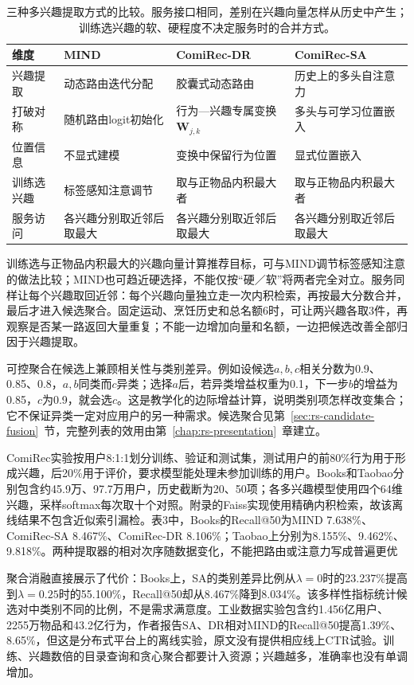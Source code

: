 \begin{table}[htbp]
 \centering\small
 \begin{tabularx}{\linewidth}{@{}lXXX@{}}
  \toprule
  维度 & MIND & ComiRec-DR & ComiRec-SA \\
  \midrule
  兴趣提取 & 动态路由迭代分配 & 胶囊式动态路由 & 历史上的多头自注意力 \\
  打破对称 & 随机路由logit初始化 & 行为—兴趣专属变换$\bm W_{j,k}$ & 多头与可学习位置嵌入 \\
  位置信息 & 不显式建模 & 变换中保留行为位置 & 显式位置嵌入 \\
  训练选兴趣 & 标签感知注意调节 & 取与正物品内积最大者 & 取与正物品内积最大者 \\
  服务访问 & 各兴趣分别取近邻后取最大 & 各兴趣分别取近邻后取最大 & 各兴趣分别取近邻后取最大 \\
  \bottomrule
 \end{tabularx}
 \caption{三种多兴趣提取方式的比较。服务接口相同，差别在兴趣向量怎样从历史中产生；训练选兴趣的软、硬程度不决定服务时的合并方式。}
 \label{tab:rs-mind-comirec}
\end{table}

训练选与正物品内积最大的兴趣向量计算推荐目标，可与MIND调节标签感知注意的做法比较；MIND也可趋近硬选择，不能仅按“硬／软”将两者完全对立。服务同样让每个兴趣取回近邻：每个兴趣向量独立走一次内积检索，再按最大分数合并，最后才进入候选聚合。固定运动、烹饪历史和总名额6时，可让两兴趣各取3件，再观察是否某一路返回大量重复；不能一边增加向量和名额，一边把候选改善全部归因于兴趣提取。

可控聚合在候选上兼顾相关性与类别差异。例如设候选$a,b,c$相关分数为0.9、0.85、0.8，$a,b$同类而$c$异类；选择$a$后，若异类增益权重为0.1，下一步$b$的增益为0.85，$c$为0.9，就会选$c$。这是教学化的边际增益计算，说明类别项怎样改变集合；它不保证异类一定对应用户的另一种需求。候选聚合见第~\ref{sec:rs-candidate-fusion}~节，完整列表的效用由第~\ref{chap:rs-presentation}~章建立。

ComiRec实验按用户8:1:1划分训练、验证和测试集，测试用户的前80\%行为用于形成兴趣，后20\%用于评价，要求模型能处理未参加训练的用户。Books和Taobao分别包含约45.9万、97.7万用户，历史截断为20、50项；各多兴趣模型使用四个64维兴趣，采样softmax每次取十个对照。附录的Faiss实现使用精确内积检索，故该离线结果不包含近似索引漏检。表3中，Books的Recall@50为MIND 7.638\%、ComiRec-SA 8.467\%、ComiRec-DR 8.106\%；Taobao上分别为8.155\%、9.462\%、9.818\%。两种提取器的相对次序随数据变化，不能把路由或注意力写成普遍更优

聚合消融直接展示了代价：Books上，SA的类别差异比例从$\lambda=0$时的23.237\%提高到$\lambda=0.25$时的55.100\%，Recall@50却从8.467\%降到8.034\%。该多样性指标统计候选对中类别不同的比例，不是需求满意度。工业数据实验包含约1.456亿用户、2255万物品和43.2亿行为，作者报告SA、DR相对MIND的Recall@50提高1.39\%、8.65\%，但这是分布式平台上的离线实验，原文没有提供相应线上CTR试验。训练、兴趣数倍的目录查询和贪心聚合都要计入资源；兴趣越多，准确率也没有单调增加。

